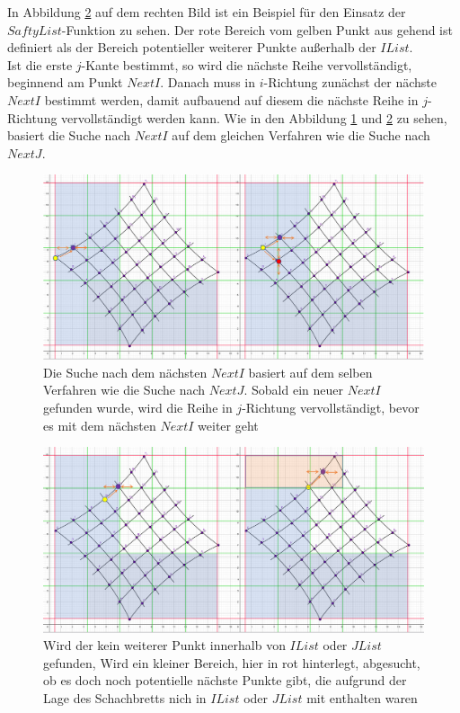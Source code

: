 In Abbildung \ref{fig:SaftyList} auf dem rechten Bild ist ein Beispiel für den Einsatz der $SaftyList$-Funktion zu sehen. Der rote Bereich vom gelben Punkt aus gehend ist definiert als der Bereich potentieller weiterer Punkte außerhalb der $IList$.\\

Ist die erste $j$-Kante bestimmt, so wird die nächste Reihe vervollständigt, beginnend am Punkt $NextI$. Danach muss in $i$-Richtung zunächst der nächste $NextI$ bestimmt werden, damit aufbauend auf diesem die nächste Reihe in $j$-Richtung vervollständigt werden kann. Wie in den Abbildung \ref{fig:FindNextIPoint} und \ref{fig:SaftyList} zu sehen, basiert die Suche nach $NextI$ auf dem gleichen Verfahren wie die Suche nach $NextJ$.\\


\begin{figure}[!htb]
	\centering
	\includegraphics[width=1\linewidth]{images/VerzeichnetesSchachbrett_5.png}
	\caption[Suche nach dem nächsten $NextI$]{Die Suche nach dem nächsten $NextI$ basiert auf dem selben Verfahren wie die Suche nach $NextJ$. Sobald ein neuer $NextI$ gefunden wurde, wird die Reihe in $j$-Richtung vervollständigt, bevor es mit dem nächsten $NextI$ weiter geht}
	\label{fig:FindNextIPoint}
\end{figure}

\begin{figure}[!htb]
	\centering
	\includegraphics[width=1\linewidth]{images/VerzeichnetesSchachbrett_6.png}
	\caption[Sicherheitsfunktion $SaftyList$]{Wird der kein weiterer Punkt innerhalb von $IList$ oder $JList$ gefunden, Wird ein kleiner Bereich, hier in rot hinterlegt, abgesucht, ob es doch noch potentielle nächste Punkte gibt, die aufgrund der Lage des Schachbretts nich in $IList$ oder $JList$ mit enthalten waren}
	\label{fig:SaftyList}
\end{figure}

